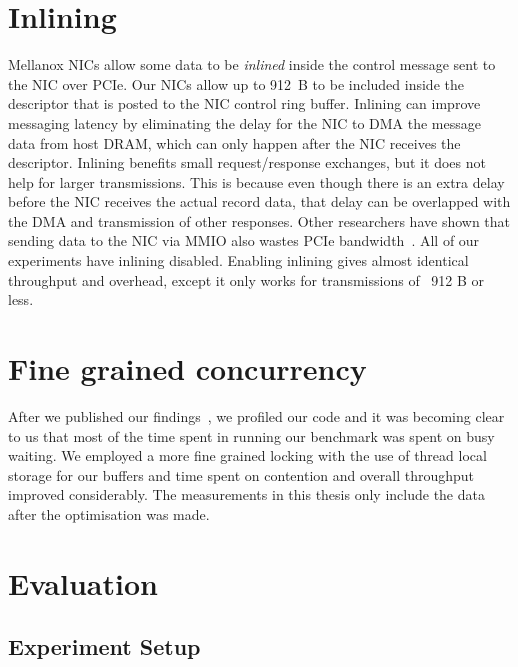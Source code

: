 \section{Inlining}
Mellanox NICs allow some data to be {\em inlined} inside the control message
sent to the NIC over PCIe. Our NICs allow up to 912~B to be included inside the
descriptor that is posted to the NIC control ring buffer.  Inlining can improve
messaging latency by eliminating the delay for the NIC to DMA the message data
from host DRAM, which can only happen after the NIC receives the descriptor.
Inlining benefits small request/response exchanges, but it does not help for
larger transmissions. This is because even though there is an extra delay
before the NIC receives the actual record data, that delay can be overlapped
with the DMA and transmission of other responses. Other researchers have shown
that sending data to the NIC via MMIO also wastes PCIe bandwidth~\cite{rdma}.
All of our experiments have inlining disabled. Enabling inlining gives almost identical throughput and overhead, except it only
works for transmissions of ~912 B or less.

\section{Fine grained concurrency}
After we published our findings~\cite{imdmpaper}, we profiled our code and it was becoming clear to us that most of the time spent 
in running our benchmark was spent on busy waiting. We employed a more fine grained 
locking with the use of thread local storage for our buffers and time spent on 
contention and overall throughput improved considerably. The measurements in this thesis only include the
data after the optimisation was made.

\section{Evaluation}




\subsection{Experiment Setup}

